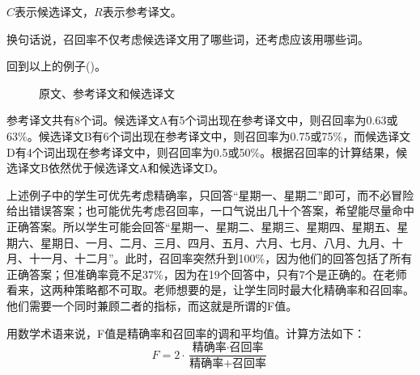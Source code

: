 \documentclass[output=paper]{langscibook}
\begin{document}
\noindent $C$表示候选译文，$R$表示参考译文。

换句话说，召回率不仅考虑候选译文用了哪些词，还考虑应该用哪些词。

回到以上的例子()。\largerpage

\begin{figure}
\small
{}
\caption{\label{bkm:Ref69668094}\label{fig:rossi:7a} 原文、参考译文和候选译文}
\end{figure}

参考译文共有8个词。候选译文A有5个词出现在参考译文中，则召回率为0.63或63\%。候选译文B有6个词出现在参考译文中，则召回率为0.75或75\%，而候选译文D有4个词出现在参考译文中，则召回率为0.5或50\%。根据召回率的计算结果，候选译文B依然优于候选译文A和候选译文D。



上述例子中的学生可优先考虑精确率，只回答“星期一、星期二”即可，而不必冒险给出错误答案；也可能优先考虑召回率，一口气说出几十个答案，希望能尽量命中正确答案。所以学生可能会回答“星期一、星期二、星期三、星期四、星期五、星期六、星期日、一月、二月、三月、四月、五月、六月、七月、八月、九月、十月、十一月、十二月”。此时，召回率突然升到100\%，因为他们的回答包括了所有正确答案；但准确率竟不足37\%，因为在19个回答中，只有7个是正确的。在老师看来，这两种策略都不可取。老师想要的是，让学生同时最大化精确率和召回率。他们需要一个同时兼顾二者的指标，而这就是所谓的F值。


用数学术语来说，F值是精确率和召回率的调和平均值。计算方法如下：
\begin{equation}
F =2 \cdot \frac{\text{精确率} \cdot \text{召回率}}{\text{精确率}+\text{召回率}}
\end{equation}
\end{document}
